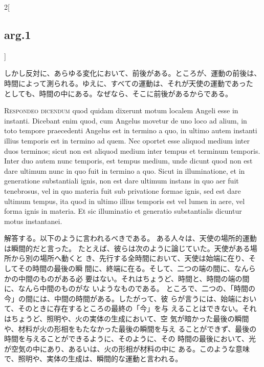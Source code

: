 \documentclass[paper=a4paper,fontsize=10pt,jafontsize=9pt,titlepage]{jlreq}
\begin{document}
\begin{paracol}{2}[\subsection{arg.1}]
\switchcolumn

しかし反対に、あらゆる変化において、前後がある。ところが、運動の前後は、
 時間によって測られる。ゆえに、すべての運動は、それが天使の運動であった
 としても、時間の中にある。なぜなら、そこに前後があるからである。


{\scshape Respondeo dicendum} quod quidam dixerunt motum
localem Angeli esse in instanti. Dicebant enim quod, cum Angelus movetur
de uno loco ad alium, in toto tempore praecedenti Angelus est in termino
a quo, in ultimo autem instanti illius temporis est in termino ad
quem. Nec oportet esse aliquod medium inter duos terminos; sicut non est
aliquod medium inter tempus et terminum temporis. Inter duo autem nunc
temporis, est tempus medium, unde dicunt quod non est dare ultimum nunc
in quo fuit in termino a quo. Sicut in illuminatione, et in generatione
substantiali ignis, non est dare ultimum instans in quo aer fuit
tenebrosus, vel in quo materia fuit sub privatione formae ignis, sed est
dare ultimum tempus, ita quod in ultimo illius temporis est vel lumen in
aere, vel forma ignis in materia. Et sic illuminatio et generatio
substantialis dicuntur motus instantanei.

\switchcolumn

解答する。以下のように言われるべきである。
ある人々は、天使の場所的運動は瞬間的だと言った。
たとえば、彼らは次のように論じていた。天使がある場所から別の場所へ動くと
 き、先行する全時間において、天使は始端に在り、そしてその時間の最後の瞬
 間に、終端に在る。そして、二つの端の間に、なんらかの中間のものがある必
 要はない。それはちょうど、時間と、時間の端の間に、なんら中間のものがな
 いようなものである。
ところで、二つの、「時間の今」の間には、中間の時間がある。したがって、彼
 らが言うには、始端において、そのときに存在するところの最終の「今」を与
 えることはできない。それはちょうど、照明や、火の実体の生成において、空
 気が暗かった最後の瞬間や、材料が火の形相をもたなかった最後の瞬間を与え
 ることができず、最後の時間を与えることができるように、そのように、その
 時間の最後において、光が空気の中にあり、あるいは、火の形相が材料の中に
 ある。このような意味で、照明や、実体の生成は、瞬間的な運動と言われる。

\switchcolumn*


\end{paracol}
\end{document}
